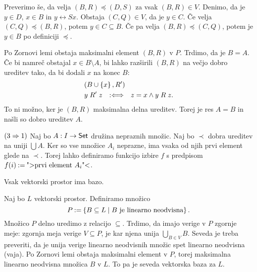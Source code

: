 \begin{dokaz}
  Preverimo še, da velja $(B,R) \preceq (D,S)$ za vsak $(B,R) \in V$. Denimo, da je $y \in D$,
  $x \in B$ in $y \rel{S} x$. Obstaja $(C,Q) \in V$, da je $y \in C$. Če velja $(C,Q) \preceq (B,R)$,
  potem $y \in C \subseteq B$. Če pa velja $(B,R) \preceq (C,Q)$, potem je $y \in B$ po definiciji $\preceq$.

  Po Zornovi lemi obstaja maksimalni element $(B,R)$ v $P$. Trdimo, da je $B = A$. Če bi namreč
  obstajal $x \in B \setminus A$, bi lahko razširili $(B,R)$ na večjo dobro ureditev tako, da bi dodali $x$
  na konec $B$:
  \begin{align*}
    & (B \cup \left\{x\right\}, R') \\
    & y \mathrel{R'} z \quad {{:}{\Longleftrightarrow}}\quad z = x \land y \mathrel{R} z.
  \end{align*}
  To ni možno, ker je $(B,R)$ maksimalna delna ureditev. Torej je res $A = B$ in
  našli so dobro ureditev $A$.

  $(3 \Rightarrow 1)$ Naj bo $A : I \to \mathsf{Set}$ družina nepraznih množic. Naj bo $\prec$ dobra ureditev
  na uniji $\bigcup A$. Ker so vse množice $A_i$ neprazne, ima vsaka od njih prvi element
  glede na $\prec$. Torej lahko definiramo funkcijo izbire $f$ s predpisom
  $f(i) \mathbin{{:}{=}} \text{">prvi element $A_i$"<}$.
\end{dokaz}

\begin{izrek}
  Vsak vektorski prostor ima bazo.
\end{izrek}

\begin{dokaz}
  Naj bo $L$ vektorski prostor. Definiramo množico
  \begin{equation*}
    P \mathbin{{:}{=}} \left\{ B \subseteq L \mid \text{$B$ je linearno neodvisna} \right\}.
  \end{equation*}
  Množico $P$ delno uredimo z relacijo $\subseteq$. Trdimo, da imajo verige v $P$ zgornje
  meje: zgornja meja verige $V \subseteq P$, je kar njena unija $\bigcup_{B \in V} B$. Seveda je
  treba preveriti, da je unija verige linearno neodvisnih množic spet linearno
  neodvisna (vaja). Po Zornovi lemi obstaja maksimalni element v $P$, torej
  maksimalna linearno neodvisna množica $B$ v $L$. To pa je seveda vektorska baza
  za $L$.
\end{dokaz}

